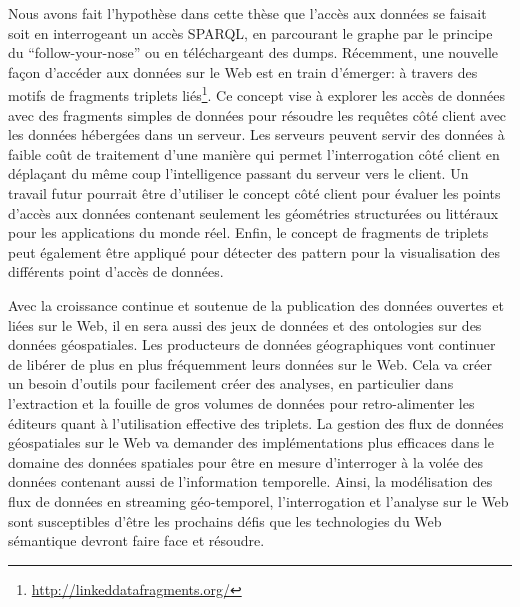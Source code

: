 \documentclass[a4paper,11pt,twoside]{report}
\begin{document}
Nous avons fait l'hypothèse dans cette thèse que l'accès aux données se faisait soit en interrogeant un accès SPARQL, en parcourant le graphe par le principe du ``follow-your-nose'' ou en téléchargeant des dumps. Récemment, une nouvelle façon d'accéder aux données sur le Web est en train d'émerger: à travers  des motifs de fragments triplets liés\footnote{\url{http://linkeddatafragments.org/}}. Ce concept vise à explorer les accès de données avec des fragments simples de données pour résoudre les requêtes côté client avec les données hébergées dans un serveur. Les serveurs peuvent servir des données à faible coût de traitement d'une manière qui permet l'interrogation côté client en déplaçant du même coup l'intelligence passant du serveur vers le client. Un travail futur pourrait être d'utiliser le concept côté client pour évaluer les points d'accès aux données contenant seulement les géométries structurées ou littéraux pour les applications du monde réel. Enfin, le concept de fragments de triplets  peut également être appliqué pour détecter des pattern pour la visualisation des différents point d'accès de données.

Avec la croissance continue et soutenue de la publication des données ouvertes et liées sur le Web, il en sera aussi des jeux de données et des ontologies sur des données géospatiales. Les producteurs de données  géographiques vont continuer de libérer de plus en plus fréquemment leurs données sur le Web. Cela va créer un besoin d'outils pour facilement créer des analyses, en particulier dans l'extraction et la fouille de gros volumes de données pour retro-alimenter les éditeurs quant à l'utilisation effective des triplets. La gestion des flux de données géospatiales sur le Web va demander des implémentations plus efficaces dans le domaine des données spatiales pour être en mesure d'interroger à la volée des données contenant aussi de l'information temporelle. Ainsi, la modélisation des flux de données en streaming géo-temporel, l'interrogation et l'analyse sur le Web sont susceptibles d'être les prochains défis que les technologies du Web sémantique devront faire face et résoudre.
\end{document}
